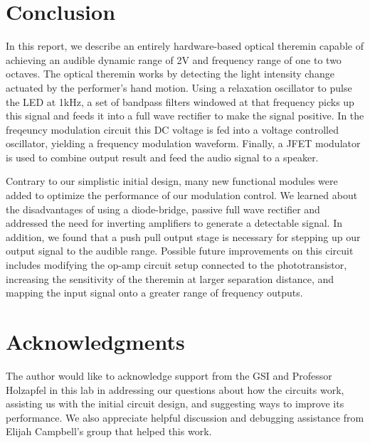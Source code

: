 \documentclass[twocolumn]{article}
\begin{document}
\section{Conclusion}
\par In this report, we describe an entirely hardware-based optical theremin capable of achieving an audible dynamic range of 2V and frequency range of one to two octaves. The optical theremin works by detecting the light intensity change actuated by the performer's hand motion. Using a relaxation oscillator to pulse the LED at 1kHz, a set of bandpass filters windowed at that frequency picks up this signal and feeds it into a full wave rectifier to make the signal positive. In the freqeuncy modulation circuit this DC voltage is fed into a voltage controlled oscillator, yielding a frequency modulation waveform. Finally, a JFET modulator is used to combine output result and feed the audio signal to a speaker.
\par  Contrary to our simplistic initial design, many new functional modules were added to optimize the performance of our modulation control. We learned about the disadvantages of using a diode-bridge, passive full wave rectifier and addressed the need for inverting amplifiers to generate a detectable signal.  In addition, we found that a push pull output stage is necessary for stepping up our output signal to the audible range.  Possible future improvements on this circuit includes modifying the op-amp circuit setup connected to the phototransistor, increasing the sensitivity of the theremin at larger separation distance, and mapping the input signal onto a greater range of frequency outputs.
\newpage
\section*{Acknowledgments}
\begin{footnotesize}
The author would like to acknowledge support from the GSI and Professor Holzapfel in this lab in addressing our questions about how the circuits work, assisting us with the initial circuit design, and suggesting ways to improve its performance.  We also appreciate helpful discussion and debugging assistance from Elijah Campbell's group that helped this work.
\end{footnotesize}
\end{document}
